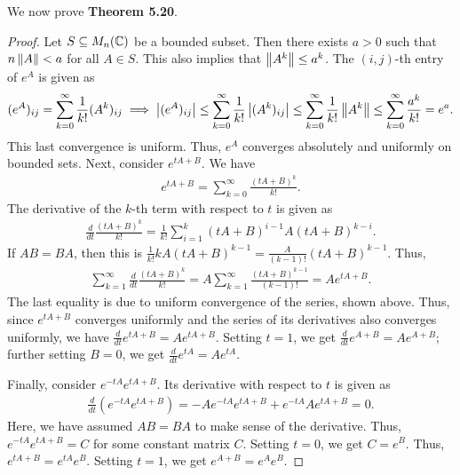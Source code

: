 We now prove \textbf{Theorem 5.20}.

\begin{proof}
    Let $S \subseteq M_{n}(\mathbb{C})$ be a bounded subset. Then there exists $a > 0$ such that $n \left\lVert A\right\rVert < a$ for all $A \in S$. This also implies that $\left\lVert A^{k}\right\rVert \leq a^{k}$. The $(i,j)$-th entry of $e^{A}$ is given as
    \begin{align}
        (e^{A})_{ij} = \sum_{k=0}^{\infty} \frac{1}{k!} (A^{k})_{ij} \implies \left| (e^{A})_{ij} \right| \leq \sum_{k=0}^{\infty} \frac{1}{k!} \left| (A^{k})_{ij} \right| \leq \sum_{k=0}^{\infty} \frac{1}{k!} \left\lVert A^{k}\right\rVert \leq \sum_{k=0}^{\infty} \frac{a^{k}}{k!} = e^{a}.
    \end{align}
    This last convergence is uniform. Thus, $e^{A}$ converges absolutely and uniformly on bounded sets. Next, consider $e^{tA+B}$. We have
    \begin{align}
        e^{tA+B} = \sum_{k=0}^{\infty} \frac{(tA+B)^{k}}{k!}.
    \end{align}
    The derivative of the $k$-th term with respect to $t$ is given as
    \begin{align}
        \frac{d}{dt} \frac{(tA+B)^{k}}{k!} = \frac{1}{k!} \sum_{i=1}^{k} (tA+B)^{i-1} A (tA+B)^{k-i}.
    \end{align}
    If $AB = BA$, then this is $\frac{1}{k!} k A(tA+B)^{k-1} = \frac{A}{(k-1)!} (tA+B)^{k-1}$. Thus,
    \begin{align}
        \sum_{k=1}^{\infty} \frac{d}{dt} \frac{(tA+B)^{k}}{k!} = A \sum_{k=1}^{\infty} \frac{(tA+B)^{k-1}}{(k-1)!} = A e^{tA+B}.
    \end{align}
    The last equality is due to uniform convergence of the series, shown above. Thus, since $e^{tA+B}$ converges uniformly and the series of its derivatives also converges uniformly, we have $\frac{d}{dt} e^{tA+B} = A e^{tA+B}$. Setting $t = 1$, we get $\frac{d}{dt} e^{A+B} = A e^{A+B}$; further setting $B = 0$, we get $\frac{d}{dt} e^{tA} = A e^{tA}$.

    Finally, consider $e^{-tA} e^{tA+B}$. Its derivative with respect to $t$ is given as
    \begin{align}
        \frac{d}{dt} (e^{-tA} e^{tA+B}) = -A e^{-tA} e^{tA+B} + e^{-tA} A e^{tA+B} = 0.
    \end{align}
    Here, we have assumed $AB = BA$ to make sense of the derivative. Thus, $e^{-tA} e^{tA+B} = C$ for some constant matrix $C$. Setting $t = 0$, we get $C = e^{B}$. Thus, $e^{tA+B} = e^{tA} e^{B}$. Setting $t = 1$, we get $e^{A+B} = e^{A} e^{B}$.
\end{proof}


